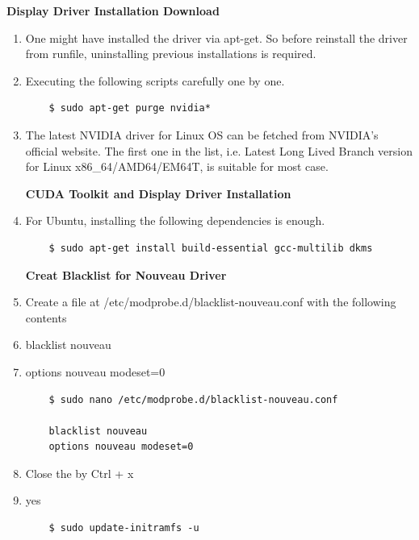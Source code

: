 \documentclass[12pt]{article}
\begin{document}
\textbf{Display Driver Installation Download}
\begin{enumerate}
  \item One might have installed the driver via apt-get. So before reinstall the driver from runfile, uninstalling previous installations is required. 
  \item Executing the following scripts carefully one by one.

\begin{lstlisting}
    $ sudo apt-get purge nvidia*
\end{lstlisting}

    \item The latest NVIDIA driver for Linux OS can be fetched from NVIDIA's official website. The first one in the list, i.e. Latest Long Lived Branch version for Linux x86\_64/AMD64/EM64T, is suitable for most case.

\textbf{CUDA Toolkit and Display Driver Installation}

    \item For Ubuntu, installing the following dependencies is enough.

\begin{lstlisting}
    $ sudo apt-get install build-essential gcc-multilib dkms
\end{lstlisting}

\textbf{Creat Blacklist for Nouveau Driver}

    \item Create a file at /etc/modprobe.d/blacklist-nouveau.conf with the following contents
    \item blacklist nouveau
    \item options nouveau modeset=0


\begin{lstlisting}
    $ sudo nano /etc/modprobe.d/blacklist-nouveau.conf

    blacklist nouveau
    options nouveau modeset=0
\end{lstlisting}

    \item Close the by Ctrl + x
    \item yes

\begin{lstlisting}
    $ sudo update-initramfs -u
    

\end{lstlisting}
\end{enumerate}
\end{document}
